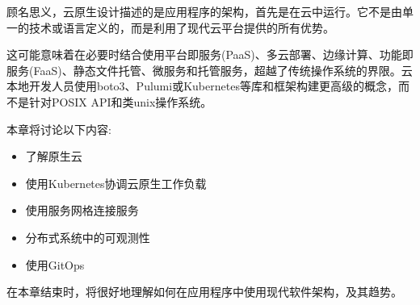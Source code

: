 
顾名思义，云原生设计描述的是应用程序的架构，首先是在云中运行。它不是由单一的技术或语言定义的，而是利用了现代云平台提供的所有优势。

这可能意味着在必要时结合使用平台即服务(PaaS)、多云部署、边缘计算、功能即服务(FaaS)、静态文件托管、微服务和托管服务，超越了传统操作系统的界限。云本地开发人员使用boto3、Pulumi或Kubernetes等库和框架构建更高级的概念，而不是针对POSIX API和类unix操作系统。

本章将讨论以下内容:

\begin{itemize}
\item 
了解原生云

\item 
使用Kubernetes协调云原生工作负载

\item 
使用服务网格连接服务

\item 
分布式系统中的可观测性

\item 
使用GitOps
\end{itemize}

在本章结束时，将很好地理解如何在应用程序中使用现代软件架构，及其趋势。